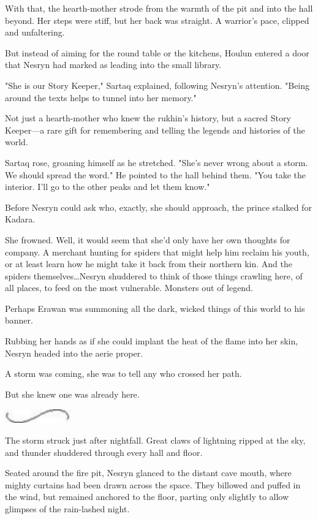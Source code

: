 With that, the hearth-mother strode from the warmth of the pit and into the hall beyond.
Her steps were stiff, but her back was straight.
A warrior's pace, clipped and unfaltering.

But instead of aiming for the round table or the kitchens, Houlun entered a door that Nesryn had marked as leading into the small library.

"She is our Story Keeper," Sartaq explained, following Nesryn's attention.
"Being around the texts helps to tunnel into her memory."

Not just a hearth-mother who knew the rukhin's history, but a sacred Story Keeper---a rare gift for remembering and telling the legends and histories of the world.

Sartaq rose, groaning himself as he stretched.
"She's never wrong about a storm.
We should spread the word."
He pointed to the hall behind them.
"You take the interior.
I'll go to the other peaks and let them know."

Before Nesryn could ask who, exactly, she should approach, the prince stalked for Kadara.

She frowned.
Well, it would seem that she'd only have her own thoughts for company.
A merchant hunting for spiders that might help him reclaim his youth, or at least learn how he might take it back from their northern kin.
And the spiders themselves\ldots Nesryn shuddered to think of those things crawling here, of all places, to feed on the most vulnerable.
Monsters out of legend.

Perhaps Erawan was summoning all the dark, wicked things of this world to his banner.

Rubbing her hands as if she could implant the heat of the flame into her skin, Nesryn headed into the aerie proper.

A storm was coming, she was to tell any who crossed her path.

But she knew one was already here.

\begin{center}
	\includegraphics[width=1.12in,height=0.24in]{images/seperator}
\end{center}

The storm struck just after nightfall.
Great claws of lightning ripped at the sky, and thunder shuddered through every hall and floor.

Seated around the fire pit, Nesryn glanced to the distant cave mouth, where mighty curtains had been drawn across the space.
They billowed and puffed in the wind, but remained anchored to the floor, parting only slightly to allow glimpses of the rain-lashed night.

